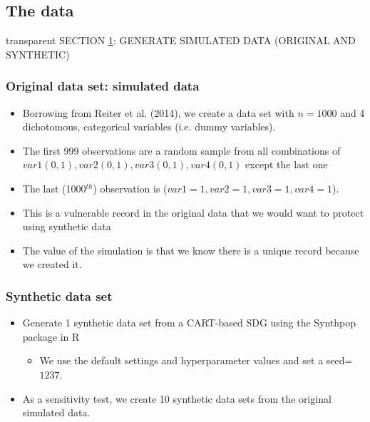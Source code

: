 \documentclass[t,8pt,utfx8]{beamer}
\begin{document}
\begin{spacing}{1.25}
\section{The data}\label{sec:data}

\begin{frame}[c,plain]
\vskip-4mm
\begin{beamercolorbox}[wd=\boxwidth,ht=22.11mm]{transparent}%
    \vfill%
    \leftinsert%
    \MakeUppercase{Section \ref{sec:data}: Generate simulated data (original and synthetic)
} %
\end{beamercolorbox}
\vskip-3mm
\end{frame}

\begin{frame}[t]\frametitle{Original data set: simulated data}
\begin{itemize}
    \item Borrowing from Reiter et al. (2014), we create a data set with $n=1000$ and 4 dichotomous, categorical variables (i.e. dummy variables). 
    \item The first 999 observations are a random sample from all combinations of $var1(0,1), var2(0,1), var3(0,1), var4(0,1)$ except the last one
    \item The last (1000$^{th}$) observation is ($var1=1,var2=1,var3=1,var4=1$). 
    \item This is a vulnerable record in the original data that we would want to protect using synthetic data
    \item The value of the simulation is that we know there is a unique record because we created it.
\end{itemize}
\end{frame}

\begin{frame}[t]\frametitle{Synthetic data set}
\begin{itemize}
    \item Generate 1 synthetic data set from a CART-based SDG using the Synthpop package in R 
    \begin{itemize}
        \item We use the default settings and hyperparameter values and set a seed=$1237$. 
    \end{itemize}
    \item As a sensitivity test, we create 10 synthetic data sets from the original simulated data.  
\end{itemize}
\end{frame}


\end{spacing}
\end{document}
